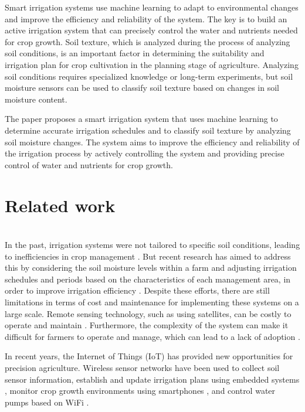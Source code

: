 \documentclass[11pt]{article}
\begin{document}
Smart irrigation systems use machine learning to adapt to environmental changes and improve the efficiency and reliability of the system. The key is to build an active irrigation system that can precisely control the water and nutrients needed for crop growth. Soil texture, which is analyzed during the process of analyzing soil conditions, is an important factor in determining the suitability and irrigation plan for crop cultivation in the planning stage of agriculture. Analyzing soil conditions requires specialized knowledge or long-term experiments, but soil moisture sensors can be used to classify soil texture based on changes in soil moisture content.

The paper proposes a smart irrigation system that uses machine learning to determine accurate irrigation schedules and to classify soil texture by analyzing soil moisture changes. The system aims to improve the efficiency and reliability of the irrigation process by actively controlling the system and providing precise control of water and nutrients for crop growth.

\section{Related work}
\indent \\In the past, irrigation systems were not tailored to specific soil conditions, leading to inefficiencies in crop management \cite{smith2008history}. But recent research has aimed to address this by considering the soil moisture levels within a farm and adjusting irrigation schedules and periods based on the characteristics of each management area, in order to improve irrigation efficiency \cite{patel2014improving}. Despite these efforts, there are still limitations in terms of cost and maintenance for implementing these systems on a large scale. Remote sensing technology, such as using satellites, can be costly to operate and maintain \cite{khan2016cost}. Furthermore, the complexity of the system can make it difficult for farmers to operate and manage, which can lead to a lack of adoption \cite{johnson2016challenges}.

In recent years, the Internet of Things (IoT) has provided new opportunities for precision agriculture. Wireless sensor networks have been used to collect soil sensor information, establish and update irrigation plans using embedded systems \cite{Patel2017}, monitor crop growth environments using smartphones \cite{Singh2017}, and control water pumps based on WiFi \cite{Ahmed2019}.
\end{document}
